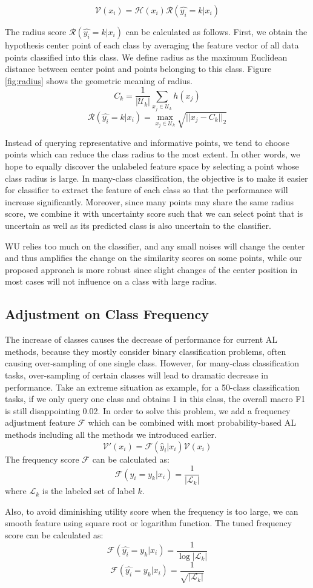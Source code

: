 $$ \mathcal{V}(x_i) = \mathcal{H}(x_i) \mathcal{R}(\hat{y_i}=k|x_i)$$
    
The radius score $\mathcal{R}(\hat{y_i}=k|x_i)$ can be calculated as follows. First, we obtain the hypothesis center point of each class by averaging the feature vector of all data points classified into this class. We define radius as the maximum Euclidean distance between center point and points belonging to this class. Figure \ref{fig:radius} shows the geometric meaning of radius.
    $$C_k = \frac{1}{|\mathcal{U}_k|} \sum_{x_j \in \mathcal{U}_k} h(x_j)$$
    $$\mathcal{R}(\hat{y_i}=k|x_i) = \max_{x_j \in \mathcal{U}_k} \sqrt{||x_j - C_k||_2} $$
    
Instead of querying representative and informative points, we tend to choose points which can reduce the class radius to the most extent. In other words, we hope to equally discover the unlabeled feature space by selecting a point whose class radius is large. In many-class classification, the objective is to make it easier for classifier to extract the feature of each class so that the performance will increase significantly. Moreover, since many points may share the same radius score, we combine it with uncertainty score such that we can select point that is uncertain as well as its predicted class is also uncertain to the classifier.
    
 WU relies too much on the classifier, and any small noises will change the center and thus amplifies the change on the similarity scores on some points, while our proposed approach is more robust since slight changes of the center position in most cases will not influence on a class with large radius.
    
\subsection{Adjustment on Class Frequency}
The increase of classes causes the decrease of performance for
current AL methods, because they mostly consider binary classification problems, 
often causing over-sampling of one single class. However, for many-class classification tasks, over-sampling of certain classes will lead to dramatic decrease in performance. Take an extreme situation as example, for a 50-class classification tasks, if we only query one class and obtains 1 in this class, the overall macro F1 is still disappointing 0.02. In order to solve this problem, we add a frequency adjustment feature 
$\mathcal{F}$ which can be combined with most probability-based AL methods
including all the methods we introduced earlier.
$$\mathcal{V}'(x_i) = \mathcal{F}(\hat{y}_i|x_i) \mathcal{V}(x_i)$$    
The frequency score $\mathcal{F}$ can be calculated as:
$$\mathcal{F}(\hat{y_i} = y_k|x_i) = \frac{1}{|\mathcal{L}_k|}$$    
where $\mathcal{L}_k$ is the labeled set of label $k$.
    
    
Also, to avoid diminishing utility score when the frequency is too large,
we can smooth feature using square root or logarithm function. 
The tuned frequency score can be calculated as: 
    $$\mathcal{F}(\hat{y_i} = y_k|x_i) = \frac{1}{\log{|\mathcal{L}_k|}}$$    
    $$\mathcal{F}(\hat{y_i} = y_k|x_i) = \frac{1}{\sqrt{|\mathcal{L}_k|}}$$    
    
